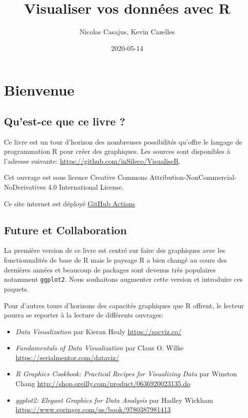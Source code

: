 \documentclass[]{article}
\title{Visualiser vos données avec R}
\author{Nicolas Casajus, Kevin Cazelles}
\date{2020-05-14}
\providecommand{\tightlist}{%
  \setlength{\itemsep}{0pt}\setlength{\parskip}{0pt}}
\begin{document}
\maketitle

{
\setcounter{tocdepth}{2}
\tableofcontents
}
\hypertarget{bienvenue}{%
\section*{Bienvenue}\label{bienvenue}}

\hypertarget{quest-ce-que-ce-livre}{%
\subsection*{Qu'est-ce que ce livre ?}\label{quest-ce-que-ce-livre}}

Ce livre est un tour d'horizon des nombreuses possibilités qu'offre le
langage de programmation R pour créer des graphiques. Les sources sont
disponibles à l'adresse suivante: \url{https://github.com/inSileco/VisualiseR}.

Cet ouvrage est sous licence
Creative Commons Attribution-NonCommercial-NoDerivatives 4.0 International License.

Ce site internet est déployé \href{https://github.com/features/actions}{GitHub
Actions}

\hypertarget{future-et-collaboration}{%
\subsection*{Future et Collaboration}\label{future-et-collaboration}}

La première version de ce livre est centré sur faire des graphiques avec les
fonctionnalités de base de R mais le paysage R a bien changé au cours des
dernières années et beaucoup de packages sont devenus très populaires notamment
\texttt{ggplot2}. Nous souhaitons augmenter cette version et introduire ces paquets.

Pour d'autres tours d'horizons des capacités graphiques que R offrent,
le lecteur pourra se reporter à la lecture de différents ouvrages:

\begin{itemize}
\tightlist
\item
  \emph{Data Visualization} par Kieran Healy \url{https://socviz.co/}
\item
  \emph{Fundamentals of Data Visualization} par Claus O. Wilke \url{https://serialmentor.com/dataviz/}
\item
  \emph{R Graphics Cookbook: Practical Recipes for Visualizing Data} par Winston Chang \url{http://shop.oreilly.com/product/0636920023135.do}
\item
  \emph{ggplot2: Elegant Graphics for Data Analysis} par Hadley Wickham
  \url{https://www.springer.com/us/book/9780387981413}
\end{itemize}
\end{document}
